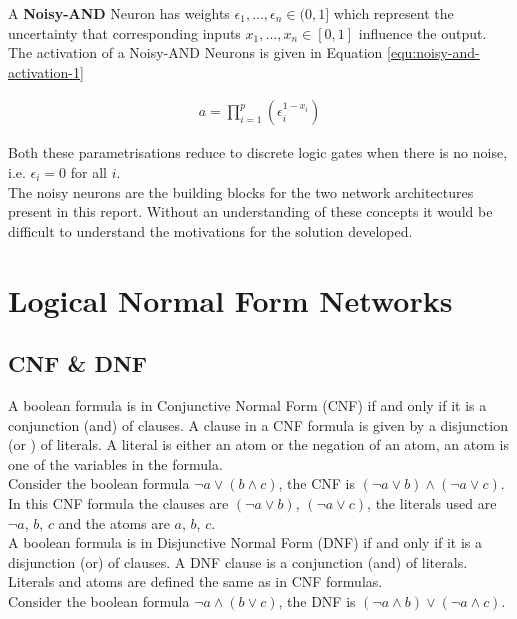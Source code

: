 \begin{definition}
	A \textbf{Noisy-AND} Neuron has weights $\epsilon_1, ..., \epsilon_n \in (0, 1]$ which represent the uncertainty that corresponding inputs $x_1, ..., x_n \in [0,1]$ influence the output. The activation of a Noisy-AND Neurons is given in Equation \ref{equ:noisy-and-activation-1}
	
	\begin{align}
	a = \prod^p_{i=1} (\epsilon_i^{1 - x_i})
	\label{equ:noisy-and-activation-1}
	\end{align}
\end{definition}

Both these parametrisations reduce to discrete logic gates when there is no noise, i.e. $\epsilon_i = 0$ for all $i$.\\
The noisy neurons are the building blocks for the two network architectures present in this report. Without an understanding of these concepts it would be difficult to understand the motivations for the solution developed.

\section{Logical Normal Form Networks}
\subsection{CNF \& DNF}
A boolean formula is in Conjunctive Normal Form (CNF) if and only if it is a conjunction (and) of clauses. A clause in a CNF formula is given by a disjunction (or ) of literals. A literal is either an atom or the negation of an atom, an atom is one of the variables in the formula.\\

Consider the boolean formula $\lnot a \lor (b \land c)$, the CNF is $(\lnot a \lor b) \land (\lnot a \lor c)$. In this CNF formula the clauses are $(\lnot a \lor b)$, $(\lnot a \lor c)$, the literals used are $\lnot a$, $b$, $c$ and the atoms are $a$, $b$, $c$.\\

A boolean formula is in Disjunctive Normal Form (DNF) if and only if it is a disjunction (or) of clauses. A DNF clause is a conjunction (and) of literals. Literals and atoms are defined the same as in CNF formulas.\\

Consider the boolean formula $\lnot a \land (b \lor c)$, the DNF is $(\lnot a \land b) \lor (\lnot a \land c)$.\\

